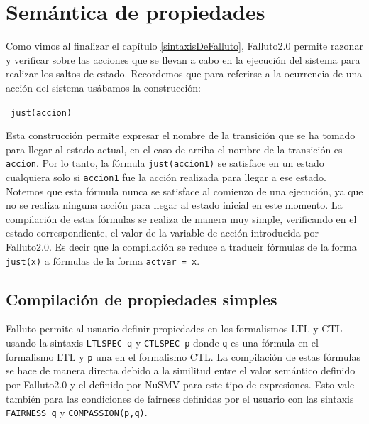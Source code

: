 \documentclass[titlepage, 12pt]{book}
\begin{document}
\section{Sem\'antica de propiedades}
Como vimos al finalizar el cap\'itulo \ref{sintaxisDeFalluto}, Falluto2.0 permite razonar y verificar sobre las acciones que se llevan a cabo en la ejecuci\'on del sistema para realizar los saltos de estado. Recordemos que para referirse a la ocurrencia de una acci\'on del sistema us\'abamos la construcci\'on:
\begin{center}\texttt{ just(accion)}\end{center}
Esta construcci\'on permite expresar el nombre de la transici\'on que se ha tomado para llegar al estado actual, en el caso de arriba el nombre de la transici\'on es \texttt{accion}. Por lo tanto, la f\'ormula \texttt{just(accion1)} se satisface en un estado cualquiera solo si \texttt{accion1} fue la acci\'on realizada para llegar a ese estado. Notemos que esta f\'ormula nunca se satisface al comienzo de una ejecuci\'on, ya que no se realiza ninguna acci\'on para llegar al estado inicial en este momento. La compilaci\'on de estas f\'ormulas se realiza de manera muy simple, verificando en el estado correspondiente, el valor de la variable de acci\'on introducida por Falluto2.0. Es decir que la compilaci\'on se reduce a traducir f\'ormulas de la forma \texttt{just(x)} a f\'ormulas de la forma \texttt{actvar = x}.
\subsection*{Compilaci\'on de propiedades simples}
Falluto permite al usuario definir propiedades en los formalismos LTL y CTL usando la sintaxis \texttt{LTLSPEC~q} y \texttt{CTLSPEC~p} donde \texttt{q} es una f\'ormula en el formalismo LTL y \texttt{p} una en el formalismo CTL. La compilaci\'on de estas f\'ormulas se hace de manera directa debido a la similitud entre el valor sem\'antico definido por Falluto2.0 y el definido por NuSMV para este tipo de expresiones. Esto vale tambi\'en para las condiciones de fairness definidas por el usuario con las sintaxis \texttt{FAIRNESS~q} y \texttt{COMPASSION(p,q)}.
\end{document}
